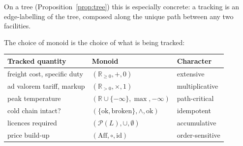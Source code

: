 \documentclass[11pt,a4paper]{article}
\theoremstyle{plain}
\theoremstyle{definition}
\theoremstyle{remark}
\begin{document}
On a tree (Proposition~\ref{prop:tree}) this is especially concrete:
a tracking is an edge-labelling of the tree, composed along the
unique path between any two facilities.

The choice of monoid is the choice of what is being tracked:
\begin{center}
\begin{tabular}{lll}
\toprule
Tracked quantity & Monoid & Character \\
\midrule
freight cost, specific duty & $(\mathbb{R}_{\geq 0}, +, 0)$ & extensive \\
ad valorem tariff, markup & $(\mathbb{R}_{> 0}, \times, 1)$ & multiplicative \\
peak temperature & $(\mathbb{R} \cup \{-\infty\}, \max, -\infty)$ & path-critical \\
cold chain intact? & $(\{\mathrm{ok}, \mathrm{broken}\}, \wedge, \mathrm{ok})$ & idempotent \\
licences required & $(\mathcal{P}(L), \cup, \emptyset)$ & accumulative \\
price build-up & $(\mathrm{Aff}, \circ, \mathrm{id})$ & order-sensitive \\
\bottomrule
\end{tabular}
\end{center}
\end{document}
